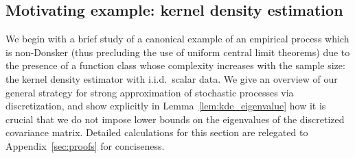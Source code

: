\subsection{Motivating example: kernel density estimation}
\label{sec:kde}

We begin with a brief study of a canonical example of an empirical process
which is non-Donsker (thus precluding the use of uniform central limit
theorems) due to the presence of a function class whose complexity increases
with the sample size: the kernel density estimator with i.i.d.\ scalar data.
We give an overview of our general strategy for
strong approximation of stochastic processes
via discretization, and show explicitly in Lemma~\ref{lem:kde_eigenvalue}
how it is crucial
that we do not impose lower bounds on the eigenvalues of the discretized
covariance matrix. Detailed calculations for this section are
relegated to Appendix~\ref{sec:proofs} for conciseness.

